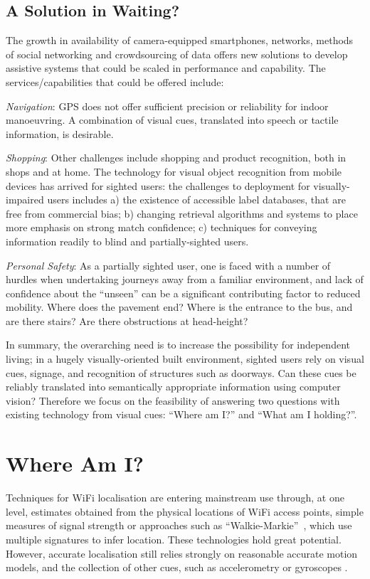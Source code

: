 \subsection{A Solution in Waiting?}
The growth in availability of camera-equipped smartphones, networks, methods of social networking and crowdsourcing of data offers new solutions to develop assistive systems that could be scaled in performance and capability\cite{Manduchi2012,Worsfold2010}. The services/capabilities that could be offered include:

\emph{Navigation}: GPS does not offer sufficient precision or reliability for indoor manoeuvring. A combination of visual cues, translated into speech or tactile information, is desirable.

\emph{Shopping}: Other challenges include shopping and product recognition, both in shops and at home. The technology for visual object recognition from mobile devices has arrived for sighted users: the challenges to deployment for visually-impaired users includes a) the existence of accessible label databases, that are free from commercial bias; b) changing retrieval algorithms and systems to place more emphasis on strong match confidence; c) techniques for conveying information readily to blind and partially-sighted users.

\emph{Personal Safety}: As a partially sighted user, one is faced with a number of hurdles when undertaking journeys away from a familiar environment, and lack of confidence about the ``unseen'' can be a significant contributing factor to reduced mobility.  Where does the pavement end?  Where is the entrance to the bus, and are there stairs?  Are there obstructions at head-height?   

In summary, the overarching need is to increase the possibility for independent living; in a hugely visually-oriented built environment, sighted users rely on visual cues, signage, and recognition of structures such as doorways.  Can these cues be reliably translated into semantically appropriate information using computer vision? Therefore we focus on the feasibility of answering two questions with existing technology from visual cues: ``Where am I?'' and ``What am I holding?''. 


\section{Where Am I?}

Techniques for WiFi localisation are entering mainstream use through, at one level, estimates obtained from the physical locations of WiFi access points, simple measures of signal strength or approaches such as ``Walkie-Markie''~\cite{Shen}, which use multiple signatures to infer location.  These technologies hold great potential.  However, accurate localisation still relies strongly on reasonable accurate motion models, and the collection of other cues, such as accelerometry or gyroscopes \cite{Wang2012}.  

